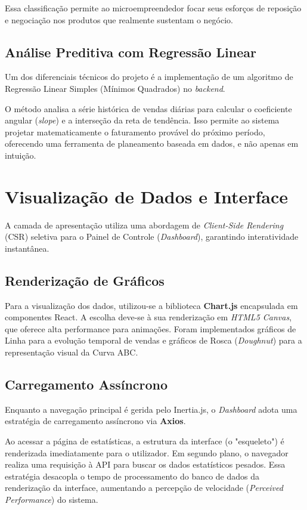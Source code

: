 Essa classificação permite ao microempreendedor focar seus esforços de reposição e negociação nos produtos que realmente sustentam o negócio.

\subsection{Análise Preditiva com Regressão Linear}
Um dos diferenciais técnicos do projeto é a implementação de um algoritmo de Regressão Linear Simples (Mínimos Quadrados) no \textit{backend}. 

O método analisa a série histórica de vendas diárias para calcular o coeficiente angular (\textit{slope}) e a interseção da reta de tendência. Isso permite ao sistema projetar matematicamente o faturamento provável do próximo período, oferecendo uma ferramenta de planeamento baseada em dados, e não apenas em intuição.

\section{Visualização de Dados e Interface}
\label{sec:visualizacao}

A camada de apresentação utiliza uma abordagem de \textit{Client-Side Rendering} (CSR) seletiva para o Painel de Controle (\textit{Dashboard}), garantindo interatividade instantânea.

\subsection{Renderização de Gráficos}
Para a visualização dos dados, utilizou-se a biblioteca \textbf{Chart.js} encapsulada em componentes React. A escolha deve-se à sua renderização em \textit{HTML5 Canvas}, que oferece alta performance para animações. Foram implementados gráficos de Linha para a evolução temporal de vendas e gráficos de Rosca (\textit{Doughnut}) para a representação visual da Curva ABC.

\subsection{Carregamento Assíncrono}
Enquanto a navegação principal é gerida pelo Inertia.js, o \textit{Dashboard} adota uma estratégia de carregamento assíncrono via \textbf{Axios}. 

Ao acessar a página de estatísticas, a estrutura da interface (o "esqueleto") é renderizada imediatamente para o utilizador. Em segundo plano, o navegador realiza uma requisição à API para buscar os dados estatísticos pesados. Essa estratégia desacopla o tempo de processamento do banco de dados da renderização da interface, aumentando a percepção de velocidade (\textit{Perceived Performance}) do sistema.

